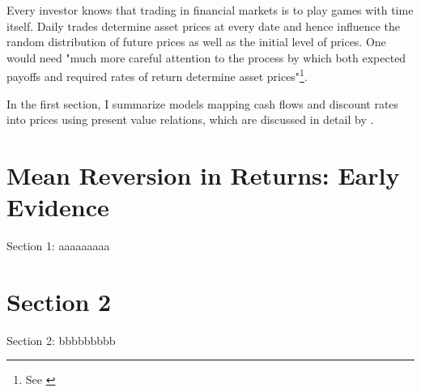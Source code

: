 \minitoc

\vspace{0.5cm}
Every investor knows that trading in financial markets is to play
games with time itself. Daily trades determine asset prices at every date and hence
influence the random distribution of future prices as well as the initial
level of prices. One would need "much more careful attention to the process
by which both expected payoffs and required rates of return determine
asset prices"\footnote{See \cite[p.~121]{campbell2017financial}}.

In the first section, I summarize models mapping cash flows and discount rates
into prices using present value relations, which are discussed in detail by
\citet[Chapter~5]{campbell2017financial}. 

\section{Mean Reversion in Returns: Early Evidence}
Section 1: aaaaaaaaa

\section{Section 2}
Section 2: bbbbbbbbb